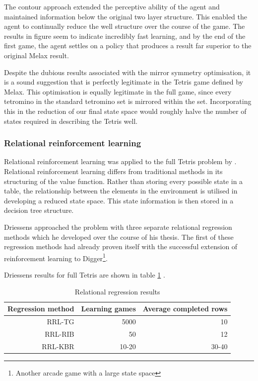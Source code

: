 \documentclass{rucsthesis}
\begin{document}
The contour approach extended the perceptive ability of the agent and maintained information below the original two layer structure. This enabled the agent to continually reduce the well structure over the course of the game. The results in figure \label{fig:yaelres} seem to indicate incredibly fast learning, and by the end of the first game, the agent settles on a policy that produces a result far superior to the original Melax result.

Despite the dubious results associated with the mirror symmetry optimisation, it is a sound suggestion that is perfectly legitimate in the Tetris game defined by Melax. This optimisation is equally legitimate in the full game, since every tetromino in the standard tetromino set is mirrored within the set. Incorporating this in the reduction of our final state space would roughly halve the number of states required in describing the Tetris well.

\subsubsection{Relational reinforcement learning}

Relational reinforcement learning was applied to the full Tetris problem by \cite{kurt}. Relational reinforcement learning differs from traditional methods in its structuring of the value function. Rather than storing every possible state in a table, the relationship between the elements in the environment is utilised in developing a reduced state space. This state information is then stored in a decision tree structure. 

Driessens approached the problem with three separate relational regression methods \citep{kurt} which he developed over the course of his thesis. The first of these regression methods had already proven itself with the successful extension of reinforcement learning to Digger\footnote{Another arcade game with a large state space}. 

Driessens results for full Tetris are shown in table \ref{tbl:driessens} .

\begin{table}[h]
\centering
\begin{tabular}{|r|r|r|}
\hline
Regression method & Learning games & Average completed rows \\
\hline
RRL-TG	&	5000	& 	10   \\
\hline
RRL-RIB  &  50  & 12  \\
\hline
RRL-KBR  &  10-20  & 30-40  \\
\hline
\end{tabular}
\caption{Relational regression results \citep{kurt}}
\label{tbl:driessens}
\end{table}
\end{document}
